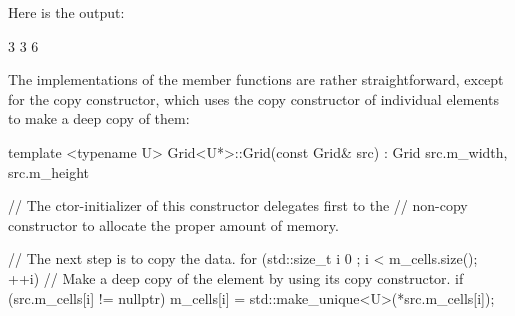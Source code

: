 Here is the output:

\begin{shell}
3
3
6
\end{shell}

The implementations of the member functions are rather straightforward, except for the copy constructor, which uses the copy constructor of individual elements to make a deep copy of them:

\begin{cpp}
template <typename U>
Grid<U*>::Grid(const Grid& src)
    : Grid { src.m_width, src.m_height }
{
    // The ctor-initializer of this constructor delegates first to the
    // non-copy constructor to allocate the proper amount of memory.

    // The next step is to copy the data.
    for (std::size_t i { 0 }; i < m_cells.size(); ++i) {
        // Make a deep copy of the element by using its copy constructor.
        if (src.m_cells[i] != nullptr) {
            m_cells[i] = std::make_unique<U>(*src.m_cells[i]);
        }
    }
}
\end{cpp}






































